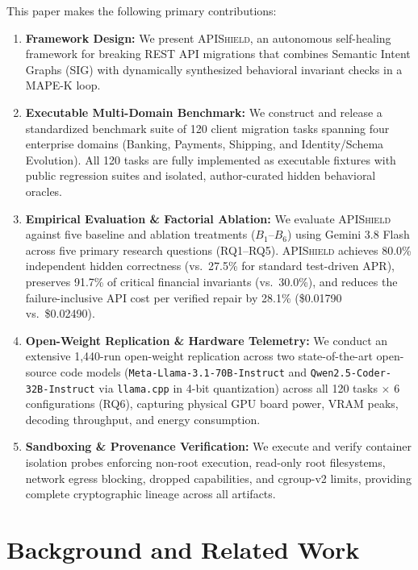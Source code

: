 This paper makes the following primary contributions:
\begin{enumerate}
    \item \textbf{Framework Design:} We present \textsc{APIShield}, an autonomous self-healing framework for breaking REST API migrations that combines Semantic Intent Graphs (SIG) with dynamically synthesized behavioral invariant checks in a MAPE-K loop.
    \item \textbf{Executable Multi-Domain Benchmark:} We construct and release a standardized benchmark suite of 120 client migration tasks spanning four enterprise domains (Banking, Payments, Shipping, and Identity/Schema Evolution). All 120 tasks are fully implemented as executable fixtures with public regression suites and isolated, author-curated hidden behavioral oracles.
    \item \textbf{Empirical Evaluation \& Factorial Ablation:} We evaluate \textsc{APIShield} against five baseline and ablation treatments ($B_1$--$B_6$) using Gemini 3.8 Flash across five primary research questions (RQ1--RQ5). \textsc{APIShield} achieves 80.0\% independent hidden correctness (vs.\ 27.5\% for standard test-driven APR), preserves 91.7\% of critical financial invariants (vs.\ 30.0\%), and reduces the failure-inclusive API cost per verified repair by 28.1\% (\$0.01790 vs.\ \$0.02490).
    \item \textbf{Open-Weight Replication \& Hardware Telemetry:} We conduct an extensive 1,440-run open-weight replication across two state-of-the-art open-source code models (\texttt{Meta-Llama-3.1-70B-Instruct} and \texttt{Qwen2.5-Coder-32B-Instruct} via \texttt{llama.cpp} in 4-bit quantization) across all 120 tasks $\times$ 6 configurations (RQ6), capturing physical GPU board power, VRAM peaks, decoding throughput, and energy consumption.
    \item \textbf{Sandboxing \& Provenance Verification:} We execute and verify container isolation probes enforcing non-root execution, read-only root filesystems, network egress blocking, dropped capabilities, and cgroup-v2 limits, providing complete cryptographic lineage across all artifacts.
\end{enumerate}

\section{Background and Related Work}
\label{sec:related}

